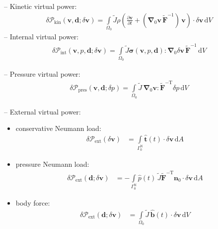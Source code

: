 \documentclass[a4paper,12pt]{report}
\newcommand{\bs}[1]{\boldsymbol{#1}}
\newcommand{\Om}{\mathit{\Omega}}
\newcommand{\Gm}{\mathit{\Gamma}}
\begin{document}
-- Kinetic virtual power:
\begin{equation}
\begin{aligned}
\delta \mathcal{P}_{\mathrm{kin}}(\bs{v},\bs{d};\delta\bs{v}) = \int\limits_{\Om_0} \widetilde{J} \rho\left(\frac{\partial\bs{v}}{\partial t} + (\bs{\nabla}_{0}\bs{v}\,\widetilde{\bs{F}}^{-1})\,\bs{v}\right) \cdot \delta\bs{v} \,\mathrm{d}V
\end{aligned}
\end{equation}
-- Internal virtual power:
\begin{equation}
\begin{aligned}
\delta \mathcal{P}_{\mathrm{int}}(\bs{v},p,\bs{d};\delta\bs{v}) = 
\int\limits_{\Om_0} \widetilde{J}\bs{\sigma}(\bs{v},p,\bs{d}) : \bs{\nabla}_{0} \delta\bs{v}\,\widetilde{\bs{F}}^{-1} \,\mathrm{d}V
\end{aligned}
\end{equation}

-- Pressure virtual power:
\begin{equation}
\begin{aligned}
\delta \mathcal{P}_{\mathrm{pres}}(\bs{v},\bs{d};\delta p) = 
\int\limits_{\Om_0} \widetilde{J}\,\bs{\nabla}_{0}\bs{v} : \widetilde{\bs{F}}^{-\mathrm{T}}\delta p\,\mathrm{d}V
\end{aligned}
\end{equation}

-- External virtual power:\\
\begin{itemize}
\item conservative Neumann load:
\begin{equation}
\begin{aligned}
\delta \mathcal{P}_{\mathrm{ext}}(\delta\bs{v}) &= \int\limits_{\Gm_0^{\mathrm{N}}} \hat{\bs{t}}(t) \cdot \delta\bs{v} \,\mathrm{d}A
\end{aligned}
\end{equation}
\item pressure Neumann load:
\begin{equation}
\begin{aligned}
\delta \mathcal{P}_{\mathrm{ext}}(\bs{d};\delta\bs{v}) &= -\int\limits_{\Gm_0^{\mathrm{N}}} \hat{p}(t)\,\widetilde{J}\widetilde{\bs{F}}^{-\mathrm{T}}\bs{n}_{0} \cdot \delta\bs{v} \,\mathrm{d}A 
\end{aligned}
\end{equation}
\item body force:
\begin{equation}
\begin{aligned}
\delta \mathcal{P}_{\mathrm{ext}}(\bs{d};\delta\bs{v}) &= \int\limits_{\Om_0} \widetilde{J}\,\hat{\bs{b}}(t) \cdot \delta\bs{v} \,\mathrm{d}V
\end{aligned}
\end{equation}
\end{itemize}
\end{document}
